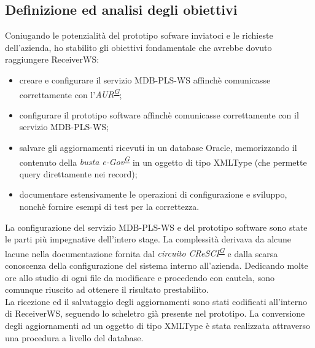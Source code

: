 \documentclass[a4paper]{article}
\begin{document}
\subsection{Definizione ed analisi degli obiettivi}
Coniugando le potenzialità del prototipo sofware inviatoci e le richieste dell'azienda, ho stabilito gli obiettivi fondamentale che avrebbe dovuto raggiungere ReceiverWS:
\begin{itemize}
	\item creare e configurare il servizio MDB-PLS-WS affinchè comunicasse correttamente con l'\textit{AUR\textsuperscript{\hyperref[sec:gl]{G}}};
	\item configurare il prototipo software affinchè comunicasse correttamente con il servizio MDB-PLS-WS;
    \item salvare gli aggiornamenti ricevuti in un database Oracle, memorizzando il contenuto della \textit{busta e-Gov\textsuperscript{\hyperref[sec:gl]{G}}} in un oggetto di tipo XMLType (che permette query direttamente nei record);
    \item documentare estensivamente le operazioni di configurazione e sviluppo, nonchè fornire esempi di test per la correttezza.
\end{itemize}
La configurazione del servizio MDB-PLS-WS e del prototipo software sono state le parti più impegnative dell'intero stage. La complessità derivava da alcune lacune nella documentazione fornita dal \textit{circuito CReSCI\textsuperscript{\hyperref[sec:gl]{G}}} e dalla scarsa conoscenza della configurazione del sistema interno all'azienda. Dedicando molte ore allo studio di ogni file da modificare e procedendo con cautela, sono comunque riuscito ad ottenere il risultato prestabilito.
\\
La ricezione ed il salvataggio degli aggiornamenti sono stati codificati all'interno di ReceiverWS, seguendo lo scheletro già presente nel prototipo. La conversione degli aggiornamenti ad un oggetto di tipo XMLType è stata realizzata attraverso una procedura a livello del database.
\end{document}

